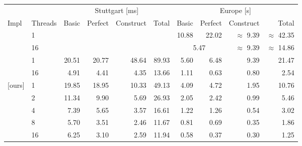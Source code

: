 \begin{tabular}{llrrrrrrrr}
\toprule
& & \multicolumn{4}{c}{Stuttgart [ms]} & \multicolumn{4}{c}{Europe [s]} \\ \cmidrule(l{3pt}r{3pt}){3-6} \cmidrule(l{3pt}r{3pt}){7-10}
Impl & Threads &     Basic & Perfect & Construct &  Total &  Basic & Perfect & Construct &  Total \\
\midrule
\cite{DBLP:journals/jea/DibbeltSW16}
& 1           &           &         &           &        &  10.88 &   22.02 & $\approx$ 9.39 & $\approx$ 42.35 \\
& 16          &           &         &           &        & \multicolumn{2}{c}{5.47} & $\approx$ 9.39 & $\approx$ 14.86 \\
\addlinespace
\cite{DBLP:journals/jea/Buchhold0W19}
& 1           &     20.51 &   20.77 &     48.64 &  89.93 &   5.60 &    6.48 &      9.39 &  21.47 \\
& 16          &      4.91 &    4.41 &      4.35 &  13.66 &   1.11 &    0.63 &      0.80 &   2.54 \\
\addlinespace
{[ours]}
& 1           &     19.85 &   18.95 &     10.33 &  49.13 &   4.09 &    4.72 &      1.95 &  10.76 \\
& 2           &     11.34 &    9.90 &      5.69 &  26.93 &   2.05 &    2.42 &      0.99 &   5.46 \\
& 4           &      7.39 &    5.65 &      3.57 &  16.61 &   1.22 &    1.26 &      0.54 &   3.02 \\
& 8           &      5.70 &    3.51 &      2.46 &  11.67 &   0.81 &    0.69 &      0.35 &   1.86 \\
& 16          &      6.25 &    3.10 &      2.59 &  11.94 &   0.58 &    0.37 &      0.30 &   1.25 \\
\bottomrule
\end{tabular}

